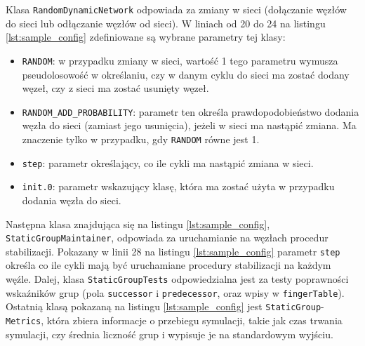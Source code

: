 \documentclass[12pt, twoside, openany]{report}
\begin{document}
Klasa \texttt{RandomDynamicNetwork} odpowiada za zmiany w sieci (dołączanie węzłów do sieci lub odłączanie węzłów od sieci). W liniach od 20 do 24 na listingu \ref{lst:sample_config} zdefiniowane są wybrane parametry tej klasy:
\begin{itemize}
\item \texttt{RANDOM}: w przypadku zmiany w sieci, wartość 1 tego parametru wymusza pseudolosowość w określaniu, czy w danym cyklu do sieci ma zostać dodany węzeł, czy z sieci ma zostać usunięty węzeł.
\item \texttt{RANDOM\_ADD\_PROBABILITY}: parametr ten określa prawdopodobieństwo dodania węzła do sieci (zamiast jego usunięcia), jeżeli w sieci ma nastąpić zmiana. Ma znaczenie tylko w przypadku, gdy \texttt{RANDOM} równe jest 1.
\item \texttt{step}: parametr określający, co ile cykli ma nastąpić zmiana w sieci.
\item \texttt{init.0}: parametr wskazujący klasę, która ma zostać użyta w przypadku dodania węzła do sieci.
\end{itemize}

Następna klasa znajdująca się na listingu \ref{lst:sample_config}, \texttt{StaticGroupMaintainer}, odpowiada za uruchamianie na węzłach procedur stabilizacji. Pokazany w linii 28 na listingu \ref{lst:sample_config} parametr \texttt{step} określa co ile cykli mają być uruchamiane procedury stabilizacji na każdym węźle. Dalej, klasa \texttt{StaticGroupTests} odpowiedzialna jest za testy poprawności wskaźników grup (pola \texttt{successor} i \texttt{predecessor}, oraz wpisy w \texttt{fingerTable}). Ostatnią klasą pokazaną na listingu \ref{lst:sample_config} jest \texttt{StaticGroup}-\texttt{Metrics}, która zbiera informacje o przebiegu symulacji, takie jak czas trwania symulacji, czy średnia liczność grup i wypisuje je na standardowym wyjściu.
\end{document}
